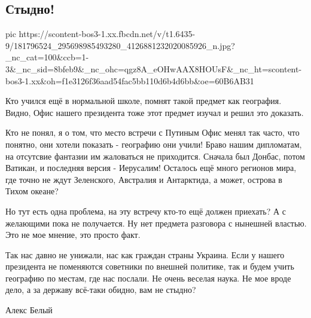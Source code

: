  
 
 
 
 

\subsection{Стыдно!}

\ifcmt
  pic https://scontent-bos3-1.xx.fbcdn.net/v/t1.6435-9/181796524_295698985493280_4126881232020085926_n.jpg?_nc_cat=100&ccb=1-3&_nc_sid=8bfeb9&_nc_ohc=qgz8A_eOHwAAX8HOUsF&_nc_ht=scontent-bos3-1.xx&oh=f1e3126f36aad54fac5bb110d6b4d6bb&oe=60B6AB31
\fi

Кто учился ещё в нормальной школе, помнят такой предмет как география. Видно,
Офис нашего президента тоже этот предмет изучал и решил это доказать. 

Кто не понял, я о том, что место встречи с Путиным Офис менял так часто, что
понятно, они хотели показать - географию они учили! Браво нашим дипломатам, на
отсутсвие фантазии  им жаловаться не приходится. Сначала был Донбас, потом
Ватикан, и последняя версия - Иерусалим!  Осталось ещё много регионов мира, где
точно не ждут Зеленского, Австралия и Антарктида, а может, острова в Тихом
океане? 

Но тут есть одна проблема, на эту встречу кто-то ещё должен приехать? А с
желающими пока не получается. Ну нет предмета разговора с нынешней властью. Это
не мое мнение, это просто факт.

Так нас давно не унижали, нас как граждан страны Украина.  Если у нашего
президента не поменяются советники по внешней политике, так и будем учить
географию по местам, где нас послали. Не очень веселая наука. Не мое вроде
дело, а за державу всё-таки обидно, вам не стыдно?

Алекс Белый
